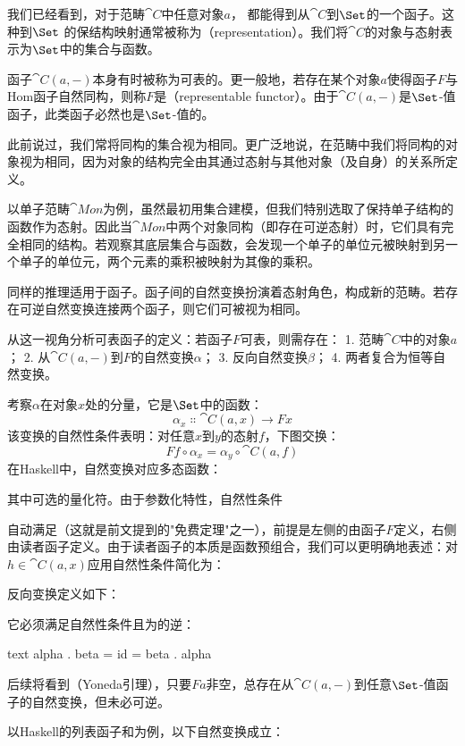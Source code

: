 我们已经看到，对于范畴$\cat{C}$中任意对象$a$，
都能得到从$\cat{C}$到$\Set$的一个函子。这种到$\Set$
的保结构映射通常被称为（representation）。我们将$\cat{C}$的对象与态射表示为$\Set$中的集合与函数。

函子$\cat{C}(a, -)$本身有时被称为可表的。更一般地，若存在某个对象$a$使得函子$F$与Hom函子自然同构，则称$F$是（representable functor）。由于$\cat{C}(a, -)$是$\Set$-值函子，此类函子必然也是$\Set$-值的。

此前说过，我们常将同构的集合视为相同。更广泛地说，在范畴中我们将同构的对象视为相同，因为对象的结构完全由其通过态射与其他对象（及自身）的关系所定义。

以单子范畴$\cat{Mon}$为例，虽然最初用集合建模，但我们特别选取了保持单子结构的函数作为态射。因此当$\cat{Mon}$中两个对象同构（即存在可逆态射）时，它们具有完全相同的结构。若观察其底层集合与函数，会发现一个单子的单位元被映射到另一个单子的单位元，两个元素的乘积被映射为其像的乘积。

同样的推理适用于函子。函子间的自然变换扮演着态射角色，构成新的范畴。若存在可逆自然变换连接两个函子，则它们可被视为相同。

从这一视角分析可表函子的定义：若函子$F$可表，则需存在：
1. 范畴$\cat{C}$中的对象$a$；
2. 从$\cat{C}(a, -)$到$F$的自然变换$\alpha$；
3. 反向自然变换$\beta$；
4. 两者复合为恒等自然变换。

考察$\alpha$在对象$x$处的分量，它是$\Set$中的函数：
$$\alpha_x \Colon \cat{C}(a, x) \to F x$$
该变换的自然性条件表明：对任意$x$到$y$的态射$f$，下图交换：
$$F f \circ \alpha_x = \alpha_y \circ \cat{C}(a, f)$$
在Haskell中，自然变换对应多态函数：

其中可选的量化符。由于参数化特性，自然性条件

自动满足（这就是前文提到的"免费定理"之一），前提是左侧的由函子$F$定义，右侧由读者函子定义。由于读者函子的本质是函数预组合，我们可以更明确地表述：对$h \in \cat{C}(a, x)$应用自然性条件简化为：

反向变换定义如下：

它必须满足自然性条件且为的逆：

\begin{snip}{text}
alpha . beta = id = beta . alpha
\end{snip}
后续将看到（Yoneda引理），只要$F a$非空，总存在从$\cat{C}(a, -)$到任意$\Set$-值函子的自然变换，但未必可逆。

以Haskell的列表函子和为例，以下自然变换成立：

